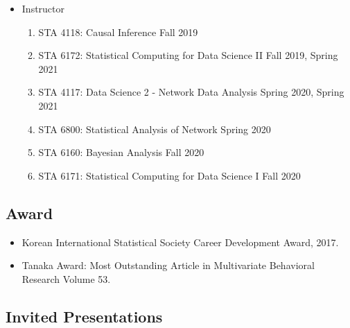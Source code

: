 \documentclass[
]{book}
\providecommand{\tightlist}{%
  \setlength{\itemsep}{0pt}\setlength{\parskip}{0pt}}
\begin{document}
\begin{enumerate}
  \begin{itemize}
  \tightlist
  \item
    Instructor

    \begin{enumerate}
    \def\labelenumii{\arabic{enumii}.}
    \tightlist
    \item
      STA 4118: Causal Inference Fall 2019
    \item
      STA 6172: Statistical Computing for Data Science II Fall 2019, Spring 2021
    \item
      STA 4117: Data Science 2 - Network Data Analysis Spring 2020, Spring 2021
    \item
      STA 6800: Statistical Analysis of Network Spring 2020
    \item
      STA 6160: Bayesian Analysis Fall 2020
    \item
      STA 6171: Statistical Computing for Data Science I Fall 2020
    \end{enumerate}
  \end{itemize}
\end{enumerate}

\hypertarget{award}{%
\subsection*{Award}\label{award}}

\begin{itemize}
\tightlist
\item
  Korean International Statistical Society Career Development Award, 2017.
\item
  Tanaka Award: Most Outstanding Article in Multivariate Behavioral Research Volume 53.
\end{itemize}

\hypertarget{invited-presentations}{%
\subsection*{Invited Presentations}\label{invited-presentations}}
\end{document}
